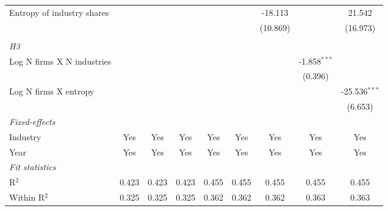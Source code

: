 \begin{tabular}{lcccccccc}
   Entropy of industry shares                            &                 &                 &                 &                  &                  & -18.113          &                  & 21.542\\   
                                                         &                 &                 &                 &                  &                  & (10.869)         &                  & (16.973)\\   
\hdashline %
\\[0.1ex] %
\emph{H3} \\ 
   Log N firms X N industries                            &                 &                 &                 &                  &                  &                  & -1.858$^{***}$   &   \\   
                                                         &                 &                 &                 &                  &                  &                  & (0.396)          &   \\   
   Log N firms X entropy                                 &                 &                 &                 &                  &                  &                  &                  & -25.536$^{***}$\\   
                                                         &                 &                 &                 &                  &                  &                  &                  & (6.653)\\   
   \midrule
   \emph{Fixed-effects}\\
   Industry                                              & Yes             & Yes             & Yes             & Yes              & Yes              & Yes              & Yes              & Yes\\  
   Year                                                  & Yes             & Yes             & Yes             & Yes              & Yes              & Yes              & Yes              & Yes\\  
   \midrule
   \emph{Fit statistics}\\
   R$^2$                                                 & 0.423           & 0.423           & 0.423           & 0.455            & 0.455            & 0.455            & 0.455            & 0.455\\  
   Within R$^2$                                          & 0.325           & 0.325           & 0.325           & 0.362            & 0.362            & 0.362            & 0.363            & 0.363\\  

\end{tabular}
